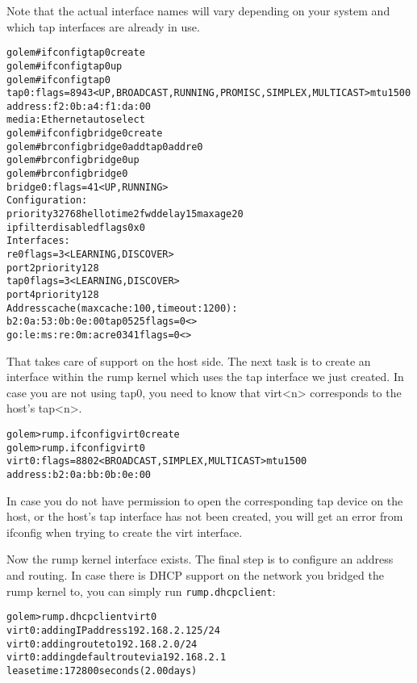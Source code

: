 Note that the actual interface names will vary depending on your
system and which tap interfaces are already in use.

{\footnotesize
\begin{alltt}
golem# ifconfig tap0 create
golem# ifconfig tap0 up
golem# ifconfig tap0
tap0: flags=8943<UP,BROADCAST,RUNNING,PROMISC,SIMPLEX,MULTICAST> mtu 1500
        address: f2:0b:a4:f1:da:00
        media: Ethernet autoselect
golem# ifconfig bridge0 create
golem# brconfig bridge0 add tap0 add re0
golem# brconfig bridge0 up
golem# brconfig bridge0
bridge0: flags=41<UP,RUNNING>
        Configuration:
                priority 32768 hellotime 2 fwddelay 15 maxage 20
                ipfilter disabled flags 0x0
        Interfaces:
                re0 flags=3<LEARNING,DISCOVER>
                        port 2 priority 128
                tap0 flags=3<LEARNING,DISCOVER>
                        port 4 priority 128
        Address cache (max cache: 100, timeout: 1200):
                b2:0a:53:0b:0e:00 tap0 525 flags=0<>
                go:le:ms:re:0m:ac re0 341 flags=0<>
\end{alltt}}

That takes care of support on the host side.  The next task is to
create an interface within the rump kernel which uses the tap
interface we just created.  In case you are not using tap0, you
need to know that virt<n> corresponds to the host's tap<n>.

{\footnotesize
\begin{alltt}
golem> rump.ifconfig virt0 create
golem> rump.ifconfig virt0
virt0: flags=8802<BROADCAST,SIMPLEX,MULTICAST> mtu 1500
        address: b2:0a:bb:0b:0e:00
\end{alltt}}

In case you do not have permission to open the corresponding tap
device on the host, or the host's tap interface has not been created,
you will get an error from ifconfig when trying to create the virt
interface.

Now the rump kernel interface exists.  The final step is to configure
an address and routing.  In case there is DHCP support on the
network you bridged the rump kernel to, you can simply run
\verb+rump.dhcpclient+:

{\footnotesize
\begin{alltt}
golem> rump.dhcpclient virt0
virt0: adding IP address 192.168.2.125/24
virt0: adding route to 192.168.2.0/24
virt0: adding default route via 192.168.2.1
lease time: 172800 seconds (2.00 days)
\end{alltt}}

